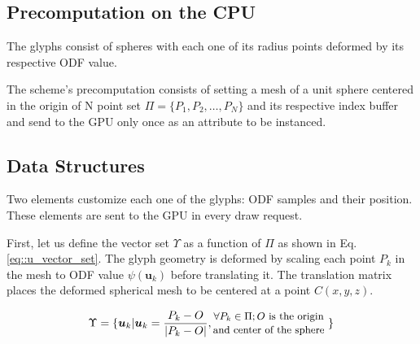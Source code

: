 \documentclass[twoside,twocolumn,10pt]{article}
\begin{document}



\subsection{Precomputation on the CPU}
\label{ssec::precomputation}

The glyphs consist of spheres with each one of its radius points deformed by its respective ODF value.

The scheme's precomputation consists of setting a mesh of a unit sphere centered in the origin of N point set $ \Pi = \{P_1, P_2, \dots, P_N\}$ and its respective index buffer and send to the GPU only once as an attribute to be instanced.




\subsection{Data Structures}
\label{ssec::datastruct}

Two elements customize each one of the glyphs: ODF samples and their position. These elements are sent to the GPU in every draw request.

First, let us define the vector set $\Upsilon$ as a function of $\Pi$ as shown in Eq. \ref{eq::u_vector_set}. The glyph geometry is deformed by scaling each point $P_k$ in the mesh to ODF value $\psi(\bm{u}_k)$ before translating it. The translation matrix places the deformed spherical mesh to be centered at a point $C(x, y, z)$.

\begin{equation}
\label{eq::u_vector_set}
\Upsilon = \{\bm{u}_k | \bm{u}_k = \frac{P_k - O}{|P_k - O|}, 
\begin{tabular}{@{}c@{}}
\small{$\forall P_k \in \Pi; O$ is the origin} \\
\small{and center of the sphere}

\end{tabular}
\text{ }\}
\end{equation}
\end{document}

